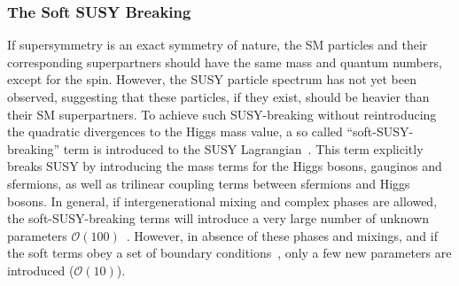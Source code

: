 \subsubsection{The Soft SUSY Breaking}
If supersymmetry is an exact symmetry of nature, the SM particles and their corresponding superpartners should have the same mass 
and quantum numbers, except for the spin. However, the SUSY particle spectrum  has not yet been observed, suggesting that  these particles,
if they exist,  should be heavier than their SM superpartners. 
To achieve such SUSY-breaking without reintroducing the quadratic divergences to the Higgs mass value, a so called ``soft-SUSY-breaking''
term is introduced to the SUSY Lagrangian~\cite{softerm1,softerm2}. This term explicitly breaks SUSY by introducing the mass terms for the 
Higgs bosons, gauginos and
sfermions, as well as  trilinear coupling terms between sfermions and Higgs bosons. In general, if intergenerational mixing and 
complex phases are allowed, the soft-SUSY-breaking terms will introduce a very large number of unknown parameters $\mathcal{O}(100)$~\cite{softerm3}.
However, in absence of these phases and  mixings, and if the soft terms obey  a set of boundary conditions~\cite{softerm1,softerm2}, 
only a few new parameters are introduced ($\mathcal{O}(10)$).




